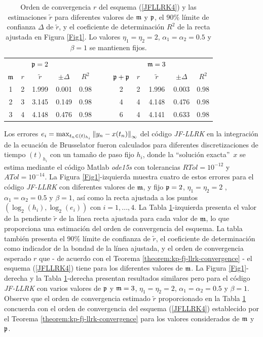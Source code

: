 \begin{table}[htb]
	\centering
	\caption{
		Orden de convergencia $r$ del esquema (\ref{JFLLRK4}) y las estimaciones $\widetilde{r}$ para diferentes valores de $\mathfrak{m}$ y $\mathfrak{p}$, el $90\%$ límite de confianza $\Delta$ de $\widetilde{r}$, y el coeficiente de determinación $R^2$ de la recta ajustada en Figura \ref{Fig1}. Lo valores $\eta_1=\eta_2=2$, $\alpha_1=\alpha_2=0.5$ y $\beta=1$ se mantienen fijos.}
	\begin{adjustbox}{width=0.8\columnwidth,center}
		\begin{tabular}{cccccllccccc}
			\cline{1-12}
			&  & $\mathfrak{p}=2$ &  &  &  &  &  &  & $\mathfrak{m}=3$ &  &  \\ \cline{2-5}\cline{9-12}
			$\mathfrak{m}$ & $r$ & $\widetilde{r}$ & $\pm \varDelta$ & $R^{2}$ &  &  & $\mathfrak{p}+\mathfrak{p}$
			& $r$ & $\widetilde{r}$ & $\pm \varDelta$ & $R^{2}$ \\ 
			\cline{1-5}\cline{8-12}
			1 & 2 & 1.999 & 0.001 & 0.98 &  &  & 2 & 2 & 1.996 & 0.003 & 0.98 \\ 
			2 & 3 & 3.145 & 0.149 & 0.98 &  &  & 4 & 4 & 4.148 & 0.476 & 0.98 \\ 
			3 & 4 & 4.148 & 0.476 & 0.98 &  &  & 6 & 4 & 4.141 & 0.633 & 0.98 \\ 
			\cline{1-12}
		\end{tabular}
	\end{adjustbox}
	\label{tab:mporders}
\end{table}


Los errores $e_i=\max_{t_n\in(t)_{h_i}}\left\lVert y_n-x(t_n) \right\rVert_\infty$ del código \textit{JF-LLRK} en la integración de la ecuación de Brusselator fueron calculados para diferentes discretizaciones de tiempo $(t)_{h_i}$ con un tamaño de paso fijo $h_i$, donde la \textquotedblleft solución exacta\textquotedblright ~$x$ se estima mediante el código Matlab \textit{ode15s} con tolerancias $RTol= 10^{-12}$ y $ATol=10^{-14}$. La Figura \ref{Fig1}-izquierda muestra cuatro de estos errores para el código \textit{JF-LLRK} con diferentes valores de $\mathfrak{m}$, y fijo $\mathfrak{p}=2$, $\eta_1=\eta_2=2$ , $\alpha_1=\alpha_2=0.5$ y $\beta=1$, así como la recta ajustada a los puntos $(\log_2(h_i),\log_2(e_i))$ con $i=1,. ..,4$. La Tabla \ref{tab:mporders}-izquierda presenta el valor de la pendiente $\widetilde{r}$ de la línea recta ajustada para cada valor de $\mathfrak{m}$, lo que proporciona una estimación del orden de convergencia del esquema. La tabla también presenta el $90\%$ límite de confianza de $\widetilde{r}$, el coeficiente de determinación como indicador de la bondad de la línea ajustada, y el orden de convergencia esperado $r$ que - de acuerdo con el Teorema \ref {theorem:kp-fj-llrk-convergence} - el esquema (\ref{JFLLRK4}) tiene para los diferentes valores de $\mathfrak{m}$. La Figura \ref{Fig1}-derecha y la Tabla \ref{tab:mporders}-derecha presentan resultados similares pero para el código \textit{JF-LLRK} con varios valores de $\mathfrak{p}$ y $\mathfrak{m}=3$, $\eta_1=\eta_2=2$, $\alpha_1=\alpha_2=0.5$ y $\beta=1$. Observe que el orden de convergencia estimado $\widetilde{r}$ proporcionado en la Tabla \ref{tab:mporders} concuerda con el orden de convergencia del esquema (\ref{JFLLRK4}) establecido por el Teorema \ref{theorem:kp-fj-llrk-convergence} para los valores considerados de $\mathfrak{m}$ y $\mathfrak{p}$.

